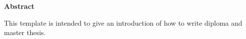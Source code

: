 \thispagestyle{empty}
\vspace*{1.4cm}

\begin{center}
    {\Large \textbf{Abstract}}
\end{center}

\vspace*{0.5cm}

\noindent
This template is intended to give an introduction of how to write diploma and master thesis. 
\\